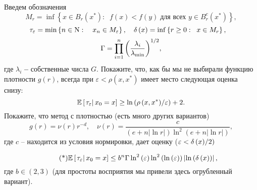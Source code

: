 \begin{problem}
\begin{enumerate}
\end{enumerate}
Введем обозначения
\[
M_r =\inf \left\{ {x\in B_r{\left( {x^* } \right)}:\;\;f\left( x 
\right)<f\left( y \right)\;\mbox{для всех }y\in B_r^{c} \left( {x^* } 
\right)} \right\},
\]
\[
\tau _\varepsilon =\min \left\{ {n\in {\rm N}:\quad x_n \in M_\varepsilon } 
\right\},
\quad
\delta \left( x \right)=\inf \left\{ {r\ge 0:\;\;x\in M_r } \right\},
\quad
\]
\[
\Gamma =\prod\limits_{i=1}^n {\left( {\frac{\lambda _i }{\lambda _{\min } }} 
\right)^{1 \mathord{\left/ {\vphantom {1 2}} \right. 
\kern-\nulldelimiterspace} 2}} ,
\]
где $\lambda _i $ \textbf{-- }собственные числа $G$. Покажите, что, как бы 
мы не выбирали функцию плотности $g\left( r \right)$, всегда при 
$\varepsilon <\rho \left( {x,x^\ast } \right)$ имеет место следующая оценка 
снизу:
\[
\Exp\left[ {\left. {\tau _\varepsilon } \right|x_0 =x} \right]\ge \ln \left( 
{{\rho \left( {x,x^\ast } \right)} \mathord{\left/ {\vphantom {{\rho \left( 
{x,x^\ast } \right)} \varepsilon }} \right. \kern-\nulldelimiterspace} 
\varepsilon } \right)+2.
\]
Покажите, что метод с плотностью (есть много других вариантов)
\[
g\left( r \right)=\nu \left( r \right)r^{-d},
\quad
\nu \left( r \right)=\frac{c}{\left( {e+n\left| {\ln r} \right|} \right)\ln 
^2\left( {e+n\left| {\ln r} \right|} \right)},
\]
где $c$ -- находится из условия нормировки, дает оценку ($\varepsilon 
<{\delta \left( x \right)} \mathord{\left/ {\vphantom {{\delta \left( x 
\right)} 2}} \right. \kern-\nulldelimiterspace} 2)$

\[\tag{*}
\mathrm{{\mathbb E}}\left[ {\left. {\tau _\varepsilon } \right|x_0 =x} \right]\le b^n\Gamma \ln 
^2\left( \varepsilon \right)\ln ^2\left( {\ln \left( \varepsilon \right)} 
\right)\left| {\ln \left( {\delta \left( x \right)} \right)} \right|, 
\]
где $b\in \left( {2,3} \right)$ (для простоты восприятия мы привели здесь 
огрубленный вариант). 

\end{problem}

